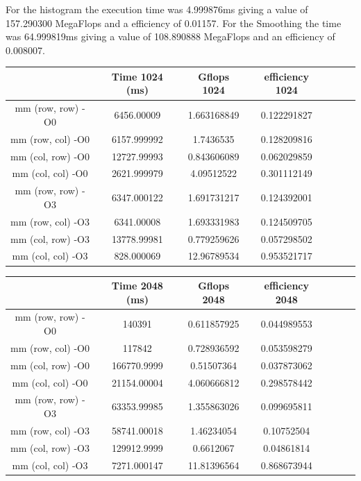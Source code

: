 \documentclass[a4paper]{article}
\begin{document}
For the histogram the execution time was 4.999876ms giving a value of 157.290300 MegaFlops and a efficiency of 0.01157. For the Smoothing the time was 64.999819ms giving a value of 108.890888 MegaFlops and an efficiency of 0.008007.

\begin{tabular}{|c|c|c|c|c|c|c|}
\hline
 & Time 1024 (ms) & Gflops 1024 & efficiency 1024 \\ \hline
mm (row, row) -O0 & 6456.00009 & 1.663168849 & 0.122291827 \\ \hline
mm (row, col) -O0 & 6157.999992 & 1.7436535 & 0.128209816 \\ \hline
mm (col, row) -O0 & 12727.99993 & 0.843606089 & 0.062029859 \\ \hline
mm (col, col) -O0 & 2621.999979 & 4.09512522 & 0.301112149 \\ \hline
mm (row, row) -O3 & 6347.000122 & 1.691731217 & 0.124392001 \\ \hline
mm (row, col) -O3 & 6341.00008 & 1.693331983 & 0.124509705 \\ \hline
mm (col, row) -O3 & 13778.99981 & 0.779259626 & 0.057298502 \\ \hline
mm (col, col) -O3 & 828.000069 & 12.96789534 & 0.953521717 \\ \hline
\end{tabular}

\begin{tabular}{|c|c|c|c|c|c|c|}
\hline
 & Time 2048 (ms) & Gflops 2048 & efficiency 2048 \\ \hline
mm (row, row) -O0 & 140391 & 0.611857925 & 0.044989553 \\ \hline
mm (row, col) -O0 & 117842 & 0.728936592 & 0.053598279 \\ \hline
mm (col, row) -O0 & 166770.9999 & 0.51507364 & 0.037873062 \\ \hline
mm (col, col) -O0 & 21154.00004 & 4.060666812 & 0.298578442 \\ \hline
mm (row, row) -O3 & 63353.99985 & 1.355863026 & 0.099695811 \\ \hline
mm (row, col) -O3 & 58741.00018 & 1.46234054 & 0.10752504 \\ \hline
mm (col, row) -O3 & 129912.9999 & 0.6612067 & 0.04861814 \\ \hline
mm (col, col) -O3 & 7271.000147 & 11.81396564 & 0.868673944 \\ \hline
\end{tabular}
\end{document}
